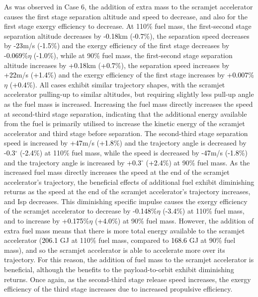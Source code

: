 As was observed in Case 6, the addition of extra mass to the scramjet accelerator causes the first stage separation altitude and speed to decrease, and also for the first stage exergy efficiency to decrease. At 110\% fuel mass, the first-second stage separation altitude decreases by \textcolor{black}{-0.18}km (\textcolor{black}{-0.7}\%), the separation speed decreases by \textcolor{black}{-23}m/s (\textcolor{black}{-1.5}\%) and the exergy efficiency of the first stage decreases by \textcolor{black}{-0.069}\%$\eta$ (\textcolor{black}{-1.0}\%), while at 90\% fuel mass, the first-second stage separation altitude increases by \textcolor{black}{+0.18}km (\textcolor{black}{+0.7}\%), the separation speed increases by \textcolor{black}{+22}m/s (\textcolor{black}{+1.4}\%) and the exergy efficiency of the first stage increases by \textcolor{black}{+0.007}\%$\eta$ (\textcolor{black}{+0.4}\%).
All cases exhibit similar trajectory shapes, with the scramjet accelerator pulling-up to similar altitudes, but requiring slightly less pull-up angle as the fuel mass is increased. Increasing the fuel mass directly increases the speed at second-third stage separation, indicating that the additional energy available from the fuel is primarily utilised to increase the kinetic energy of the scramjet accelerator and third stage before separation. The second-third stage separation speed is increased by \textcolor{black}{+47}m/s (\textcolor{black}{+1.8}\%) and the trajectory angle is decreased by \textcolor{black}{-0.3}$^\circ$ (\textcolor{black}{-2.4}\%) at 110\% fuel mass, while the speed is decreased by \textcolor{black}{-47}m/s (\textcolor{black}{-1.8}\%) and the trajectory angle is increased by \textcolor{black}{+0.3}$^\circ$ (\textcolor{black}{+2.4}\%) at 90\% fuel mass. 
As the increased fuel mass directly increases the speed at the end of the scramjet accelerator's trajectory, the beneficial effects of additional fuel exhibit diminishing returns as the speed at the end of the scramjet accelerator's trajectory increases, and Isp decreases.
This diminishing specific impulse causes the exergy efficiency of the scramjet accelerator to decrease by \textcolor{black}{-0.148}\%$\eta$ (\textcolor{black}{-3.4}\%) at 110\% fuel mass, and to increase by \textcolor{black}{+0.175}\%$\eta$ (\textcolor{black}{+4.0}\%) at 90\% fuel mass. 
However, the addition of extra fuel mass means that there is more total energy available to the scramjet accelerator (\textcolor{black}{206.1} GJ at 110\% fuel mass, compared to \textcolor{black}{168.6} GJ at 90\% fuel mass), and so the scramjet accelerator is able to accelerate more over its trajectory. For this reason, the addition of fuel mass to the scramjet accelerator is beneficial, although the benefits to the payload-to-orbit exhibit diminishing returns. 
Once again, as the second-third stage release speed increases, the exergy efficiency of the third stage increases due to increased propulsive efficiency. 


